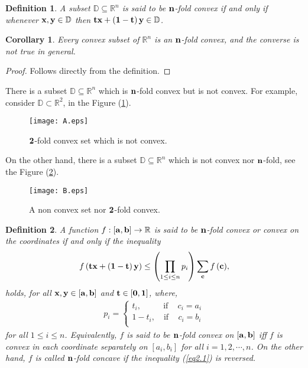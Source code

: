\documentclass{amsart}
\theoremstyle{plain}
\newtheorem{corollary}{Corollary}
\newtheorem{definition}{Definition}
\numberwithin{equation}{section}
\begin{document}
\begin{definition}
A subset $\mathbb{D} \subseteq \mathbb{R}^n$ is said to be
${\bf{n}}$-fold convex if and only if whenever ${\bf{x}},{\bf{y}}
\in \mathbb{D}$ then ${\bf{t}} {\bf{x}}+ \left( {{\bf{1}} -
{\bf{t}}} \right){\bf{y}} \in \mathbb{D}$.
\end{definition}

\begin{corollary}
Every convex subset of $\mathbb{R}^n$ is an ${\bf{n}}$-fold
convex, and the converse is not true in general.
\end{corollary}

\begin{proof}
Follows directly from the definition.
\end{proof}

There is a subset $\mathbb{D} \subseteq \mathbb{R}^n$ which is
${\bf{n}}$-fold convex but is not convex. For example, consider
$\mathbb{D} \subset \mathbb{R}^2$, in the Figure (\ref{figer1}).
\begin{figure}[!h]
\texttt{[image: A.eps]}
\caption{${\bf{2}}$-fold convex set which is not convex.}
\label{figer1}
\end{figure}
On the other hand, there is a subset $\mathbb{D} \subseteq
\mathbb{R}^n$ which is not convex nor ${\bf{n}}$-fold, see the
Figure (\ref{figer2}).
\begin{figure}[!h]
\texttt{[image: B.eps]}
\caption{A non convex set nor ${\bf{2}}$-fold convex.}
\label{figer2}
\end{figure}

\begin{definition}
A function $f:\left[ {{\bf{a}},{\bf{b}}} \right] \to \mathbb{R}$
is said to be ${\bf{n}}$-fold convex or convex on the coordinates
if and only if the inequality
\begin{align}
\label{eq2.1}f\left( {{\bf{t}} {\bf{x}}+ \left( {{\bf{1}} -
{\bf{t}}} \right){\bf{y}}} \right) \le \left( {\prod\limits_{1 \le
i \le n} {p_i } } \right)\sum\limits_{\bf{c}} {f\left( {\bf{c}}
\right)},
\end{align}
holds, for all ${\bf{x}}, {\bf{y}} \in  \left[ {{\bf{a}},{\bf{b}}}
\right]$ and ${\bf{t}} \in  \left[ {{\bf{0}},{\bf{1}}} \right]$,
where,
\begin{align}
\label{eq2.2}p_i  = \left\{ \begin{array}{l}
 t_i ,\,\,\,\,\,\,\,\,\,\,\,\,\,\,\,\,\text{if}\,\,\,\,\,\,\,c_i  = a_i  \\
 1 - t_i ,\,\,\,\,\,\,\text{if}\,\,\,\,\,\,\,c_i  = b_i  \\
 \end{array} \right.
\end{align}
for all $1\le i \le n$. Equivalently, $f$ is said to be
${\bf{n}}$-fold convex on $\left[ {{\bf{a}},{\bf{b}}} \right]$ iff
$f$ is convex in each coordinate separately on $[a_i,b_i]$ for all
$i=1,2,\cdots, n$. On the other hand, $f$ is called
${\bf{n}}$-fold concave if the inequality (\ref{eq2.1}) is
reversed.
\end{definition}
\end{document}

